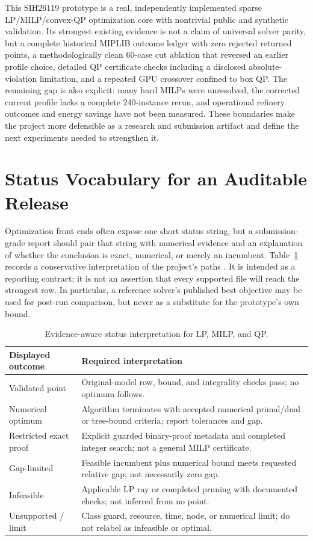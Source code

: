 \documentclass[10pt,a4paper,twocolumn]{article}
\begin{document}
This SIH26119 prototype is a real, independently implemented sparse LP/MILP/convex-QP optimization core with nontrivial public and synthetic validation. Its strongest existing evidence is not a claim of universal solver parity, but a complete historical MIPLIB outcome ledger with zero rejected returned points, a methodologically clean 60-case cut ablation that reversed an earlier profile choice, detailed QP certificate checks including a disclosed absolute-violation limitation, and a repeated GPU crossover confined to box QP. The remaining gap is also explicit: many hard MILPs were unresolved, the corrected current profile lacks a complete 240-instance rerun, and operational refinery outcomes and energy savings have not been measured. These boundaries make the project more defensible as a research and submission artifact and define the next experiments needed to strengthen it.

\appendix
\section{Status Vocabulary for an Auditable Release}

Optimization front ends often expose one short status string, but a submission-grade report should pair that string with numerical evidence and an explanation of whether the conclusion is exact, numerical, or merely an incumbent. Table~\ref{tab:status} records a conservative interpretation of the project's paths \cite{arch,binaryproof}. It is intended as a reporting contract; it is not an assertion that every supported file will reach the strongest row. In particular, a reference solver's published best objective may be used for post-run comparison, but never as a substitute for the prototype's own bound.

\begin{table}[h]
\centering\small
\caption{Evidence-aware status interpretation for LP, MILP, and QP.}
\label{tab:status}
\begin{tabularx}{\columnwidth}{@{}p{}X@{}}
\toprule
Displayed outcome & Required interpretation \\
\midrule
Validated point & Original-model row, bound, and integrality checks pass; no optimum follows.\\
Numerical optimum & Algorithm terminates with accepted numerical primal/dual or tree-bound criteria; report tolerances and gap.\\
Restricted exact proof & Explicit guarded binary-proof metadata and completed integer search; not a general MILP certificate.\\
Gap-limited & Feasible incumbent plus numerical bound meets requested relative gap; not necessarily zero gap.\\
Infeasible & Applicable LP ray or completed pruning with documented checks; not inferred from no point.\\
Unsupported / limit & Class guard, resource, time, node, or numerical limit; do not relabel as infeasible or optimal.\\
\bottomrule
\end{tabularx}
\end{table}
\end{document}
